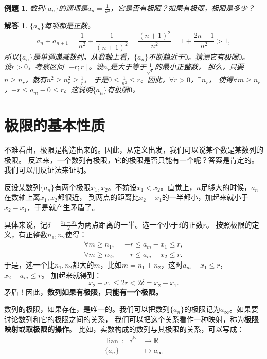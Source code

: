 \documentclass[12pt,UTF8]{ctexbook}
\newcommand{\lian}[1]{
    \underset{#1}{\operatorname{lian}\,}
}
\newtheorem{et}{例题}[section]
\newtheorem*{so}{解答}
\begin{document}
\begin{et}
数列$\{a_n\}$的通项是$a_n = \frac{1}{n^2}$，它是否有极限？如果有极限，极限是多少？    
\end{et}
\begin{so}
    $\{a_n\}$每项都是正数。
    $$a_{n} \div a_{n+1} = \frac{1}{n^2} \div \frac{1}{(n+1)^2} = \frac{(n+1)^2}{n^2} = 1 + \frac{2n+1}{n^2} > 1,$$
    所以$\{a_n\}$是单调递减数列。从数轴上看，$\{a_n\}$不断趋近于$0$。猜测它有极限$0$。\\
    设$r>0$，考察区间$[-r;r]$。设$n_r$是大于等于$\frac{1}{\sqrt{r}}$的最小正整数，
    那么，只要$n \geqslant n_r$，就有$n^2 \geqslant n_r^2 \geqslant \frac{1}{r}$，
    于是$0 \leqslant \frac{1}{n^2} \leqslant r$。因此，$\forall r > 0$，$\exists n_r$，
    使得$\forall m \geqslant n_r$，$ -r  \leqslant a_m - 0 \leqslant r$。这说明$\{a_n\}$有极限$0$。    
\end{so}

\section{极限的基本性质}
不难看出，极限是构造出来的。因此，从定义出发，我们可以说某个数是某数列的极限。
反过来，一个数列有极限，它的极限是否只能有一个呢？答案是肯定的。我们可以用反证法来证明。

反设某数列$\{a_n\}$有两个极限$x_1, x_2$。不妨设$x_1 < x_2$。直觉上，$n$足够大的时候，$a_n$在数轴上离$x_1, x_2$都很近，
到两点的距离比$x_2 - x_1$的一半都小，加起来就小于$x_2 - x_1$，于是就产生矛盾了。

具体来说，记$\delta = \frac{x_2 - x_1}{2}$为两点距离的一半。选一个小于$\delta$的正数$r$。
按照极限的定义，有正整数$n_1, n_2$使得：
\begin{align*}
    \forall m \geqslant n_1 , \,\,\,& -r \leqslant a_m - x_1 \leqslant r ,  \\
    \forall m \geqslant n_2 , \,\,\,& -r \leqslant a_m - x_2 \leqslant r .  
\end{align*}
于是，选一个比$n_1,n_2$都大的$m$，比如$m=n_1+n_2$，这时$a_m - x_1 \leqslant r$，$x_2 - a_m \leqslant r$。
加起来就得到：
$$x_2 - x_1 \leqslant 2r < 2\delta = x_2 - x_1.$$
矛盾！因此，\textbf{数列如果有极限，只能有一个极限。}

数列的极限，如果存在，是唯一的。我们可以把数列$\{a_n\}$的极限记为$a_\infty$。如果要讨论数列和它的极限之间的关系，
我们可以把这个关系看作一种映射，称为\textbf{极限映射}或\textbf{取极限的操作}。
比如，实数构成的数列与其极限的关系，可以写成：
\begin{align*}
    \lian{} : \,\,\, \mathbb{R}^\mathbb{N} &\longrightarrow \mathbb{R}  \\
    \{a_n\} &\longmapsto a_\infty 
\end{align*}
\end{document}
